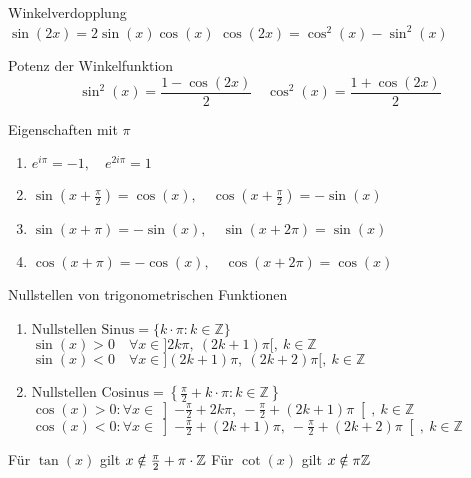  \begin{corollary}{Winkelverdopplung}\\
         $\sin(2x) = 2 \sin(x)\cos(x)$ \hspace{4mm} $\cos(2x) = \cos^2(x) - \sin^2(x)$
 \end{corollary}
 \begin{corollary}{Potenz der Winkelfunktion}\\
    $$\sin^2(x) = \frac{1 - \cos(2x)}{2} \quad \cos^2(x) = \frac{1 + \cos(2x)}{2}$$
 \end{corollary}
 \begin{corollary}{Eigenschaften mit $\pi$}
     \begin{enumerate}[itemsep= 2pt]
         \item $e^{i\pi} = -1, \quad e^{2i\pi} = 1$
         \item $\sin\left(x + \frac{\pi}{2}\right) = \cos(x), \quad \cos\left(x + \frac{\pi}{2}\right) = -\sin(x)$
         \item $\sin(x+\pi) = -\sin (x), \quad \sin(x + 2\pi) = \sin(x)$
         \item $\cos(x+\pi) = -\cos (x), \quad \cos(x + 2\pi) = \cos(x)$
     \end{enumerate}
 \end{corollary}

 \begin{corollary}{Nullstellen von trigonometrischen Funktionen}
    \begin{enumerate}
         \item $\text{Nullstellen Sinus} = \{k\cdot \pi : k\in \mathbb{Z}\}$\\
        $\sin(x) > 0 \quad \forall x \in ]2k\pi, ~(2k+1)\pi[, ~ k\in \mathbb{Z}$\\[2pt]
        $\sin(x) < 0 \quad \forall x \in ](2k + 1)\pi, ~(2k+2)\pi[, ~ k\in \mathbb{Z}$
        \item $\text{Nullstellen Cosinus} = \left\{\frac{\pi}{2}+k\cdot \pi : k\in \mathbb{Z}\right\}$\\
        $\cos(x) > 0:\forall x \in \left]-\frac{\pi}{2} +2k\pi, ~-\frac{\pi}{2} +(2k+1)\pi\right[, ~ k\in \mathbb{Z}$\\[2pt]
        $\cos(x) < 0:\forall x \in \left]-\frac{\pi}{2} + (2k + 1)\pi, ~-\frac{\pi}{2} +(2k+2)\pi\right[, ~ k\in \mathbb{Z}$
    \end{enumerate}
\end{corollary}
\noindent Für $\tan(x)$ gilt $x \notin \frac{\pi}{2} + \pi \cdot \mathbb{Z}$ \qquad Für $\cot(x)$ gilt $x \notin \pi \mathbb{Z}$
 

